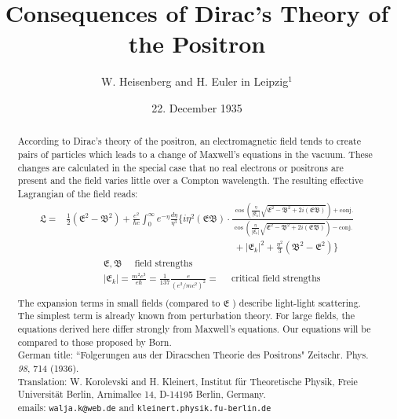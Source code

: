 \documentclass{article}
\begin{document}
  \title{Consequences of Dirac's Theory of the Positron}
  \author{W. Heisenberg and H. Euler in Leipzig$^1$}
  \date{22. December 1935}
  \maketitle


\begin{abstract}
According to Dirac's theory of the positron,
an electromagnetic
field tends to create pairs of
particles which leads to
a change of Maxwell's
equations in the vacuum. These changes are
calculated in the special case that no real electrons or
positrons are present and the field
varies little over a Compton wavelength.
The resulting effective Lagrangian of the field reads:
\begin{equation*}
\begin{split}
\scriptstyle
\mathfrak{L}=
& \scriptstyle \frac{1}{2}(\mathfrak{E}^2 -\mathfrak{B}^2) + \frac{e^2}{\hbar c}
\int_0^{\infty} e^{-\eta}\frac{d\eta}{\eta ^3}\biggl\{\scriptstyle i\eta ^2 (\mathfrak{EB}) \cdot
\frac{\ \cos{(\frac{\eta}{|\mathfrak{E}_k|} \sqrt{\mathfrak{E}^2-\mathfrak{B}^2+2i(\mathfrak{EB})})} + \text{conj.}}
{\cos{(\frac{\eta}{|\mathfrak{E}_k|} \sqrt{\mathfrak{E}^2-\mathfrak{B}^2+2i(\mathfrak{EB})})} - \text{conj.}}\\
& \qquad \qquad \qquad \qquad \qquad \qquad \qquad \qquad \qquad
\scriptstyle +|\mathfrak{E}_k | ^2+\frac{\eta ^2}{3}(\mathfrak{B}^2-\mathfrak{E}^2)
\biggr\}\\
& \qquad \qquad \scriptstyle \mathfrak{E},\mathfrak{B}\quad \text{ field strengths}\\
& \qquad \qquad \scriptstyle |\mathfrak{E}_k |= \frac{m^2 c^3}{e \hbar}=\frac{1}{137}\frac{e}{(e^2/m c^2)^2} =\quad \text{ critical field strengths}\\
\end{split}
\end{equation*}
The expansion terms in small fields (compared to $\mathfrak E$ ) describe light-light scattering.
The simplest term is already known from perturbation theory.
For large fields, the equations derived here
differ strongly from
Maxwell's equations. Our  equations
will be compared to those proposed by Born.
\\ [3mm]
German title:
``Folgerungen aus der Diracschen Theorie des Positrons"
Zeitschr. Phys. {\em 98\/}, 714 (1936). \\[2mm]
Translation:
W. Korolevski and H. Kleinert,
Institut f\"ur Theoretische Physik,
Freie Universit\"at Berlin, Arnimallee 14, D-14195 Berlin, Germany. \\
emails: {\tt walja.k@web.de} and {\tt kleinert.physik.fu-berlin.de}
\end{abstract}
\end{document}
